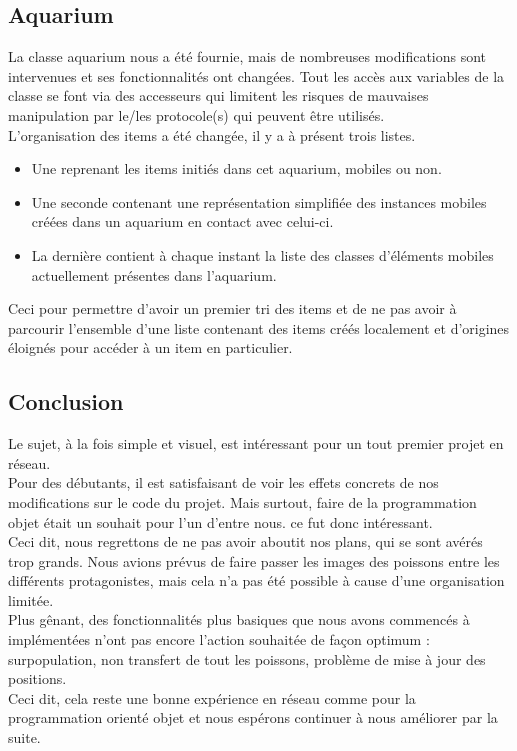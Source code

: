 \documentclass[a4paper, 12pt]{report}
\begin{document}
\begin{spacing}{1.3}
		
		
		\textcolor{colortitre3}{\subsection*{Aquarium}}    
		
	La classe aquarium nous a été fournie, mais de nombreuses modifications sont intervenues et ses fonctionnalités ont changées.
	Tout les accès aux variables de la classe se font via des accesseurs qui limitent les risques de mauvaises manipulation par le/les protocole(s) qui peuvent être utilisés. \\
	L'organisation des items a été changée, il y a à présent trois listes.
	\begin{itemize}
		\item Une reprenant les items initiés dans cet aquarium, mobiles ou non.
		\item Une seconde contenant une représentation simplifiée des instances mobiles créées dans un aquarium en contact avec celui-ci.
		\item La dernière contient à chaque instant la liste des classes d'éléments mobiles actuellement présentes dans l'aquarium.
	\end{itemize}
Ceci pour permettre d'avoir un premier tri des items et de ne pas avoir à parcourir l'ensemble d'une liste contenant des items créés localement et d'origines éloignés pour accéder à un item en particulier.


\textcolor{colortitre1}{\section*{Conclusion}} 

Le sujet, à la fois simple et visuel, est intéressant pour un tout premier projet en réseau. \\ Pour des débutants, il est satisfaisant de voir les effets concrets de nos modifications sur le code du projet. Mais surtout, faire de la programmation objet était un souhait pour l'un d'entre nous. ce fut donc intéressant.\\
Ceci dit, nous regrettons de ne pas avoir aboutit nos plans, qui se sont avérés trop grands. Nous avions prévus de faire passer les images des poissons entre les différents protagonistes, mais cela n'a pas été possible à cause d'une organisation limitée.\\
Plus gênant, des fonctionnalités plus basiques que nous avons commencés à implémentées n'ont pas encore l'action souhaitée de façon optimum : surpopulation, non transfert de tout les poissons, problème de mise à jour des positions. \\
Ceci dit, cela reste une bonne expérience en réseau comme pour la programmation orienté objet et nous espérons continuer à nous améliorer par la suite.




\end{spacing}
\end{document}
